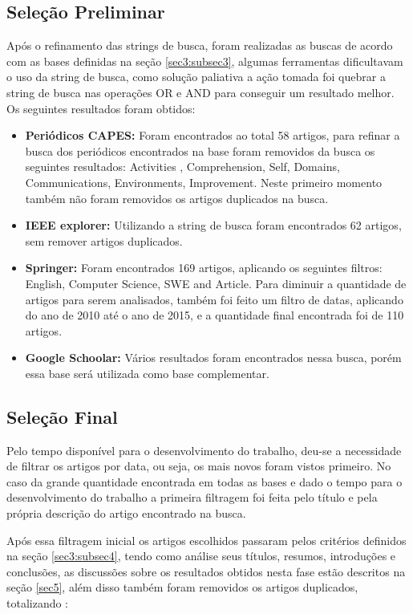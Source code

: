 \documentclass[12pt]{article}
\begin{document}
\subsection{Seleção Preliminar} \label{sec4:subsec2}
Após o refinamento das strings de busca, foram realizadas as buscas de acordo com as bases definidas na seção \ref{sec3:subsec3}, algumas ferramentas dificultavam o uso da string de busca, como solução paliativa a ação tomada foi quebrar a string de busca nas operações OR e AND para conseguir um resultado melhor. Os seguintes resultados foram obtidos:

 \begin{itemize}
   \item  \textbf{Periódicos CAPES:} Foram encontrados ao total 58 artigos, para refinar a busca dos periódicos encontrados na base foram removidos da busca os seguintes resultados: Activities , Comprehension, Self, Domains, Communications, Environments, Improvement. Neste primeiro momento também não foram removidos os artigos duplicados na busca.
   \item  \textbf{IEEE explorer:} Utilizando a string de busca foram encontrados 62 artigos, sem remover artigos duplicados.
   \item  \textbf{Springer:} Foram encontrados 169 artigos, aplicando os seguintes filtros: English, Computer Science, SWE and Article. Para diminuir a quantidade de artigos para serem analisados, também foi feito um filtro de datas, aplicando do ano de 2010 até o ano de 2015, e a quantidade final encontrada foi de 110 artigos.
   \item  \textbf{Google Schoolar:} Vários resultados foram encontrados nessa busca, porém essa base será utilizada como base complementar.
 \end{itemize}

\subsection{Seleção Final} \label{sec4:subsec3}

Pelo tempo disponível para o desenvolvimento do trabalho, deu-se a necessidade de filtrar os artigos por data, ou seja, os mais novos foram vistos primeiro. No caso da grande quantidade encontrada em todas as bases e dado o tempo para o desenvolvimento do trabalho a primeira filtragem foi feita pelo título e pela própria descrição do artigo encontrado na busca.

Após essa filtragem inicial os artigos escolhidos passaram pelos critérios definidos na seção \ref{sec3:subsec4}, tendo como análise seus títulos, resumos, introduções e conclusões, as discussões sobre os resultados obtidos nesta fase estão descritos na seção \ref{sec5}, além disso também foram removidos os artigos duplicados, totalizando :
\end{document}
